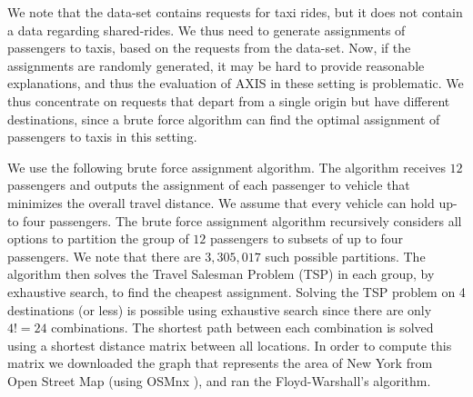 \documentclass[letterpaper]{article} %
\begin{document}
We note that the data-set contains requests for taxi rides, but it does not contain a data regarding shared-rides. We thus need to generate assignments of passengers to taxis, based on the requests from the data-set. Now, if the assignments are randomly generated, it may be hard to provide reasonable explanations, and thus the evaluation of AXIS in these setting is problematic. We thus concentrate on requests that depart from a single origin but have different destinations, since a brute force algorithm can find the optimal assignment of passengers to taxis in this setting.

We use the following brute force assignment algorithm. The algorithm receives $12$ passengers and outputs the assignment of each passenger to vehicle that minimizes the overall travel distance. We assume that every vehicle can hold up-to four passengers.
The brute force assignment algorithm recursively considers all options to partition the group of $12$ passengers to subsets of up to four passengers. We note that there are $3,305,017$ such possible partitions. %
The algorithm then solves the
Travel Salesman Problem (TSP) in each group, by exhaustive search, to find the cheapest assignment.
%
Solving the TSP problem on 4 destinations (or less) is possible using exhaustive search since there are only $4!=24$ combinations. The shortest path between each combination is solved using a shortest distance matrix between all locations.
In order to compute this matrix we downloaded the graph that represents the area of New York from Open Street Map (using OSMnx \cite{boeing2017osmnx}), and ran the Floyd-Warshall's algorithm.

\end{document}
